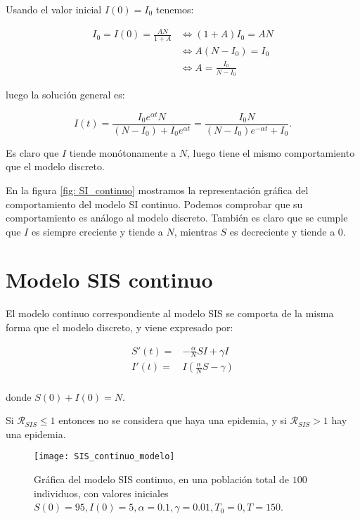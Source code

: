 Usando el valor inicial $I(0)=I_0$ tenemos:

\begin{equation}
\begin{aligned}
I_0 = I(0) = \frac{AN}{1+A} & \Leftrightarrow (1+A)I_0 = AN \\
& \Leftrightarrow A(N-I_0) = I_0 \\
& \Leftrightarrow A = \frac{I_0}{N-I_0}
\end {aligned}
\end{equation}

luego la solución general es:

$$I(t) = \frac{I_0e^{\alpha t}N}{(N-I_0)+I_0e^{\alpha t}} = \frac{I_0N}{(N-I_0)e^{-\alpha t}+I_0}.$$

Es claro que $I$ tiende monótonamente a $N$, luego tiene el mismo comportamiento que el modelo discreto.

En la figura \ref{fig: SI_continuo} mostramos la representación gráfica del comportamiento del modelo SI continuo. Podemos comprobar que su comportamiento es análogo al modelo discreto. También es claro que se cumple que $I$ es siempre creciente y tiende a $N$, mientras $S$ es decreciente y tiende a $0$.

\section{Modelo SIS continuo}

El modelo continuo correspondiente al modelo SIS se comporta de la misma forma que el modelo discreto, y viene expresado por:

\begin{equation}
\label{eqn: modelo_SIS_continuo}
\begin{aligned}
S'(t) = & -\frac{\alpha}{N}SI+\gamma I \\
I'(t) = & I\left( \frac{\alpha}{N}S-\gamma \right) \\
\end{aligned}
\end{equation}

donde $S(0)+I(0)=N$.

Si $\mathcal{R}_{SIS}\leq 1$ entonces no se considera que haya una epidemia, y si $\mathcal{R}_{SIS} > 1$ hay una epidemia.

\begin{figure}
\begin{center}
\caption{Gráfica del modelo SIS continuo, en una población total de $100$ individuos, con valores iniciales $S(0)=95, I(0) = 5, \alpha = 0.1, \gamma = 0.01, T_0 = 0, T = 150$.}
\label{fig: SIS_continuo}
\texttt{[image: SIS\_continuo\_modelo]}
\end{center}
\end{figure}

